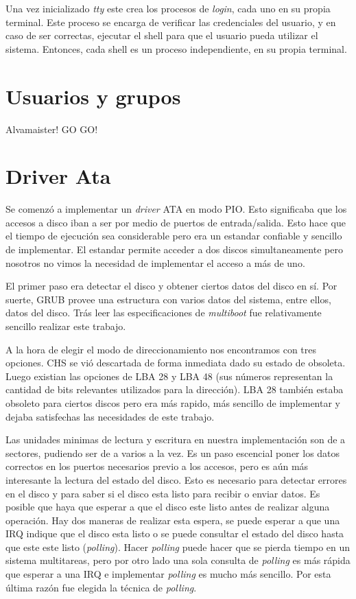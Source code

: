 \documentclass[a4paper,10pt]{article}
\begin{document}
Una vez inicializado \textit{tty} este crea los procesos de \textit{login}, cada uno en su propia terminal.
Este proceso se encarga de verificar las credenciales del usuario, y en caso de ser correctas, ejecutar el shell para que el usuario pueda utilizar el sistema.
Entonces, cada shell es un proceso independiente, en su propia terminal.

\newpage
\section{Usuarios y grupos}
Alvamaister! GO GO!

\newpage
\section{Driver Ata}
    Se comenzó a implementar un \textit{driver} ATA en modo PIO. Esto significaba que los accesos a disco iban a ser
    por medio de puertos de entrada/salida. Esto hace que el tiempo de ejecución sea considerable pero era un estandar
    confiable y sencillo de implementar.
    El estandar permite acceder a dos discos simultaneamente pero nosotros no vimos la necesidad de implementar el 
    acceso a más de uno.
    
    El primer paso era detectar el disco y obtener ciertos datos del disco en sí. Por suerte, GRUB provee una estructura
    con varios datos del sistema, entre ellos, datos del disco. Trás leer las especificaciones de \textit{multiboot}
    fue relativamente sencillo realizar este trabajo.

    A la hora de elegir el modo de direccionamiento nos encontramos con tres opciones. CHS se vió descartada de forma
    inmediata dado su estado de obsoleta. Luego existian las opciones de LBA 28 y LBA 48 (sus números representan
    la cantidad de bits relevantes utilizados para la dirección). LBA 28 también estaba obsoleto para ciertos discos
    pero era más rapido, más sencillo de implementar y dejaba satisfechas las necesidades de este trabajo.

    Las unidades minimas de lectura y escritura en nuestra implementación son de a sectores, pudiendo ser de a
    varios a la vez. Es un paso escencial poner los datos correctos en los puertos necesarios previo a los accesos, pero
    es aún más interesante la lectura del estado del disco. Esto es necesario para detectar errores en el disco
    y para saber si el disco esta listo para recibir o enviar datos. Es posible que haya que esperar a que el disco
    este listo antes de realizar alguna operación. Hay dos maneras de realizar esta espera, se puede esperar a que una IRQ
    indique que el disco esta listo o se puede consultar el estado del disco hasta que este este listo (\textit{polling}).
    Hacer \textit{polling} puede hacer que se pierda tiempo en un sistema multitareas, pero por otro lado una sola
    consulta de \textit{polling} es más rápida que esperar a una IRQ e implementar \textit{polling} es mucho más sencillo.
    Por esta última razón fue elegida la técnica de \textit{polling}.
\newpage
\end{document}
